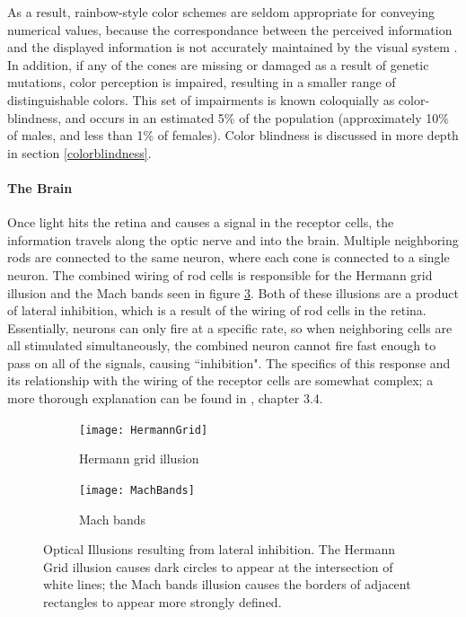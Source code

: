 \documentclass[11pt]{isuthesis}\usepackage[]{graphicx}\usepackage[]{color}
\begin{document}
As a result, rainbow-style color schemes are seldom appropriate for conveying numerical values, because the correspondance between the perceived information and the displayed information is not accurately maintained by the visual system \citep{rainbowcolor}. In addition, if any of the cones are missing or damaged as a result of genetic mutations, color perception is impaired, resulting in a smaller range of distinguishable colors. This set of impairments is known coloquially as color-blindness, and occurs in an estimated 5\% of the population (approximately 10\% of males, and less than 1\% of females). Color blindness is discussed in more depth in section \ref{colorblindness}. 

\paragraph{The Brain}
Once light hits the retina and causes a signal in the receptor cells, the information travels along the optic nerve and into the brain. Multiple neighboring rods are connected to the same neuron, where each cone is connected to a single neuron. The combined wiring of rod cells is responsible for the Hermann grid illusion and the Mach bands seen in figure \ref{fig:InhibitionIllusions}. Both of these illusions are a product of lateral inhibition, which is a result of the wiring of rod cells in the retina. Essentially, neurons can only fire at a specific rate, so when neighboring cells are all stimulated simultaneously, the combined neuron cannot fire fast enough to pass on all of the signals, causing ``inhibition". The specifics of this response and its relationship with the wiring of the receptor cells are somewhat complex; a more thorough explanation can be found in \citet{goldstein}, chapter 3.4. 

\begin{figure}
\centering
\begin{subfigure}[b]{.45\linewidth}
  \centering
  \texttt{[image: HermannGrid]}
  \caption{\small Hermann grid illusion \label{fig:hermanngrid}}
\end{subfigure}\hfill
\begin{subfigure}[b]{.45\linewidth}
  \centering
  \texttt{[image: MachBands]}
  \caption{\small Mach bands 
  \label{fig:machbands}}
\end{subfigure}
\caption[Inhibition illusions]{Optical Illusions resulting from lateral inhibition. The Hermann Grid illusion causes dark circles to appear at the intersection of white lines; the Mach bands illusion causes the borders of adjacent rectangles to appear more strongly defined.} \label{fig:InhibitionIllusions}
\end{figure}
\end{document}

